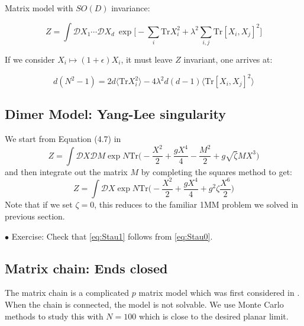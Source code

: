 \documentclass[11pt]{article}
\begin{document}
Matrix model with $SO(D)$ invariance:

\begin{equation}
	Z = \int \mathcal{D}X_1 \cdots \mathcal{D}X_d ~
	\exp\Big[ -\sum_{i} \mbox{Tr} X_{i}^{2} + \lambda^2 \sum_{i,j} \mbox{Tr} [X_i,X_j]^{2}\Big]
\end{equation}

If we consider $X_i \mapsto (1+\epsilon) X_i$, it must leave $Z$ invariant, one arrives at:

\begin{equation}
	d(N^2 -1) = 2d \langle \mbox{Tr}X_{i}^{2} \rangle 
	-4 \lambda^2 d(d-1) \langle \mbox{Tr}[X_i,X_j]^{2} \rangle
\end{equation}

\subsection{Dimer Model: Yang-Lee singularity}

We start from Equation (4.7) in \cite{Staudacher:1989fy} 
\begin{equation}
	\label{eq:Stau0}
	Z = \int \mathcal{D}X \mathcal{D}M \exp N \mbox{Tr}\Bigg(-\frac{X^2}{2} + \frac{gX^4}{4} - \frac{M^2}{2} + g \sqrt{\zeta} MX^3 \Bigg)
\end{equation}
and then integrate out the matrix $M$ by completing the squares method to get:
\begin{equation}
	\label{eq:Stau1} 
	Z = \int \mathcal{D}X \exp N \mbox{Tr}\Bigg(-\frac{X^2}{2} + \frac{gX^4}{4} + g^2 \zeta  \frac{X^6}{2}   \Bigg)
\end{equation}
Note that if we set $\zeta=0$, this reduces to the familiar 1MM problem we solved in previous section. 


\begin{mdframed}[backgroundcolor=blue!3]  
	$\bullet$ Exercise: Check that \ref{eq:Stau1} follows from \ref{eq:Stau0}. 
\end{mdframed} 



\subsection{Matrix chain: Ends closed}

The matrix chain is a complicated $p$ matrix model which was first considered in \cite{Chadha:1980ri}. When the chain is connected, the model is not solvable. We use Monte Carlo methods to study this with $N=100$ which is close to the desired planar limit. 
\end{document}

